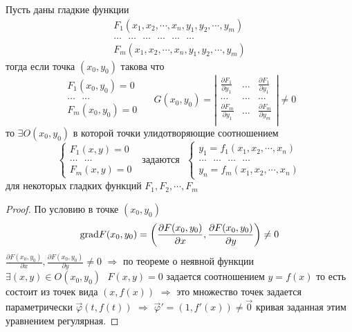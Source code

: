 \begin{theorem}
  Пусть  даны гладкие функции
  $$
  \begin{array}{c}
    F_1 (x_1, x_2, \cdots, x_n, y_1, y_2, \cdots, y_m) \\
    \dots ~~~ \dots ~~~ \dots ~~~ \dots  ~~~ \dots ~~~ \dots \\
    F_m (x_1, x_2, \cdots, x_n, y_1, y_2, \cdots, y_m)
  \end{array}
  $$
  тогда если точка $(x_0, y_0)$ такова что
  $$
  \begin{array}{c}
    F_1(x_0, y_0) = 0 \\
    \ldots ~~~ \ldots \\
    F_m(x_0, y_0) = 0 \\
  \end{array} ~~~~~~
  G(x_0, y_0) = \left|
  \begin{array}{ccc}
    \frac{\partial F_1}{\partial y_1} & \dots &
    \frac{\partial F_1}{\partial y_1} \\

    \dots & \dots & \dots \\

    \frac{\partial F_m}{\partial y_1} & \dots &
    \frac{\partial F_m}{\partial y_m} \\
  \end{array}
  \right|
  \not= 0
  $$
  то $\exists O(x_0, y_0)$ в которой точки улидотворяющие соотношением
  $$
  \left\{
  \begin{array}{c}
    F_1(x, y) = 0 \\
    \dots ~~~ \dots \\
    F_m(x, y) = 0
  \end{array}
  \right. ~~~ \text{задаются} ~~~
  \left\{
  \begin{array}{c}
    y_1 = f_1(x_1, x_2, \cdots, x_n)\\
    \dots ~~~ \dots ~~~ \dots ~~~ \dots \\
    y_n = f_m(x_1, x_2, \cdots, x_n)
  \end{array}
  \right.
  $$
  для некоторых гладких функций $F_1, F_2, \cdots, F_m $
\end{theorem}

\begin{proof}
  По условию в точке $(x_0, y_0)$
  $$
  \mathrm{grad} F(x_0, y_0) = \left( \frac{\partial F(x_0, y_0)}{\partial x},
  \frac{\partial F(x_0, y_0)}{\partial y} \right) \not= 0
  $$
  $\frac{\partial F(x_0, y_0)}{\partial x},
  \frac{\partial F(x_0, y_0)}{\partial y} \not= 0$ $\Rightarrow$
  по теореме о неявной функции $\exists (x, y) \in O(x_0, y_0) ~~~ F(x, y) = 0$
  задается соотношением $y = f(x)$
  то есть состоит из точек вида $(x, f(x))$ $\Rightarrow$ это множество точек
  задается параметрически $\vec \varphi (t, f(t))$  $\Rightarrow$
  $\vec \varphi' = (1, f'(x)) \not= \vec 0$ кривая заданная этим уравнением
  регулярная.
\end{proof}

